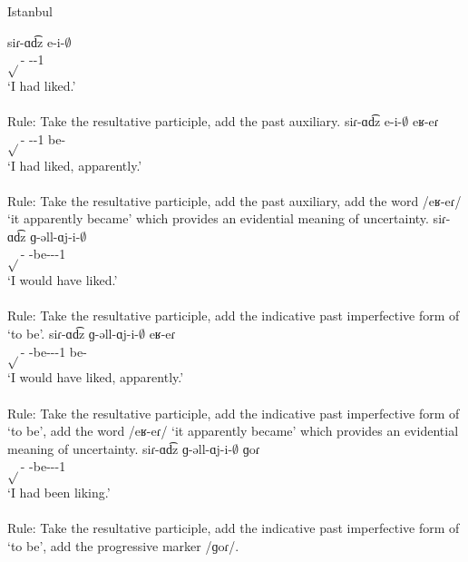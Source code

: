 

\begin{exe}
	\ex Istanbul \label{sent:Istanbul:morpho:verb:complex:resultpart:pst}
	\begin{xlist}
		\ex \gll siɾ-ɑd͡z e-i-$\emptyset$ \\
		$\sqrt{}$-{\rptcp} {\aux}-{\pst}-1{\sg} \\
		\trans `I had liked.' \\
		 \\
		Rule: Take the resultative participle, add the past auxiliary.
		\ex \gll siɾ-ɑd͡z e-i-$\emptyset$ eʁ-eɾ \\
		$\sqrt{}$-{\rptcp} {\aux}-{\pst}-1{\sg} be-{\eptcp} \\
		\trans `I had liked, apparently.' \\
		 \\
		Rule: Take the resultative participle, add the past auxiliary, add the word /eʁ-eɾ/ `it apparently became' which provides an evidential meaning of uncertainty.
		\ex \gll siɾ-ɑd͡z ɡ-əll-ɑj-i-$\emptyset$ \\
		$\sqrt{}$-{\rptcp} {\ind}-be-{\thgloss}-{\pst}-1{\sg} \\
		\trans `I would have liked.' \\
		 \\
		Rule: Take the resultative participle, add the indicative past imperfective form of `to be'.
		\ex \gll siɾ-ɑd͡z ɡ-əll-ɑj-i-$\emptyset$ eʁ-eɾ \\
		$\sqrt{}$-{\rptcp} {\ind}-be-{\thgloss}-{\pst}-1{\sg} be-{\eptcp} \\
		\trans `I would have liked, apparently.' \\
		 \\
		Rule: Take the resultative participle, add the indicative past imperfective form of `to be', add the word /eʁ-eɾ/ `it apparently became' which provides an evidential meaning of uncertainty.
		\ex \gll siɾ-ɑd͡z ɡ-əll-ɑj-i-$\emptyset$ ɡoɾ \\
		$\sqrt{}$-{\rptcp} {\ind}-be-{\thgloss}-{\pst}-1{\sg} {\prog} \\
		\trans `I had been liking.' \\
		 \\
		Rule: Take the resultative participle, add the indicative past imperfective form of `to be', add the progressive marker /ɡoɾ/. 

\end{xlist}
\end{exe}
